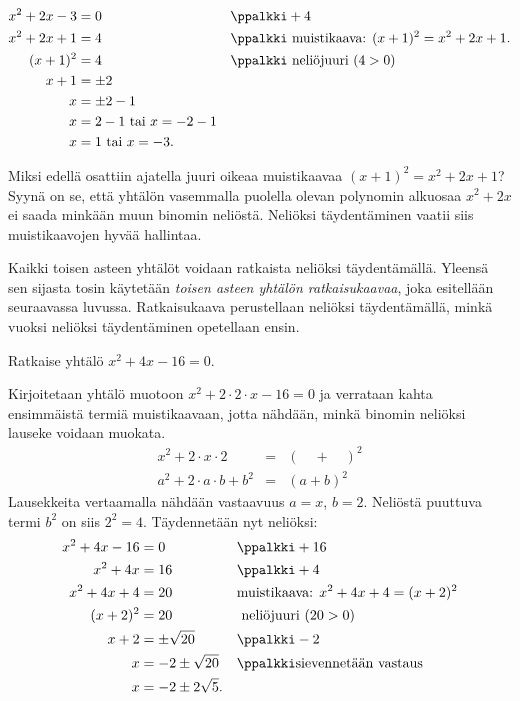 \begin{align*}
x^2+2x-3 & = 0  &&\ppalkki +4 \\
x^2+2x+1 & = 4  &&\ppalkki \text{ muistikaava: } (x+1)^2=x^2+2x+1. \\
(x+1)^2 & = 4  && \ppalkki \text{ neliöjuuri } (4 > 0)\\
x+1 & = \pm 2 \\
x & = \pm 2 - 1 \\
x & = 2-1 \text{ tai } x= -2-1 \\ 
x & = 1 \text{ tai } x= -3. 
\end{align*}

Miksi edellä osattiin ajatella juuri oikeaa muistikaavaa $(x+1)^2=x^2+2x+1$?
Syynä on se, että yhtälön vasemmalla
puolella olevan polynomin alkuosaa $x^2+2x$ ei saada minkään muun
binomin neliöstä. Neliöksi täydentäminen vaatii siis muistikaavojen hyvää
hallintaa.

Kaikki toisen asteen yhtälöt voidaan ratkaista neliöksi täydentämällä. Yleensä sen sijasta tosin käytetään \emph{toisen asteen yhtälön ratkaisukaavaa}, joka esitellään seuraavassa luvussa. Ratkaisukaava perustellaan neliöksi täydentämällä, minkä vuoksi neliöksi täydentäminen opetellaan ensin.

\begin{esimerkki} 
Ratkaise yhtälö $x^2+4x-16 = 0$. 

Kirjoitetaan yhtälö muotoon $x^2+2\cdot 2\cdot x-16 = 0$ ja verrataan kahta ensimmäistä termiä
muistikaavaan, jotta nähdään, minkä binomin neliöksi lauseke voidaan muokata.
\[ \begin{array}{lcl}
x^2+2\cdot x\cdot 2  &=& (\quad + \quad)^2\\
a^2 +2\cdot a\cdot b +b^2 &=& (a+b)^2
\end{array} \]
Lausekkeita vertaamalla nähdään vastaavuus $a = x$, $b = 2$. Neliöstä puuttuva
termi $b^2$ on siis $2^2=4$. Täydennetään nyt neliöksi:
\begin{align*}
x^2+4x-16 &= 0 && \ppalkki +16 \\
x^2+4x &= 16 && \ppalkki +4\\
x^2+4x+4 &= 20 &&  \text{muistikaava: $ x^2+4x+4= (x+2)^2$} \\
(x+2)^2 &= 20  && \text{ neliöjuuri } (20 > 0) \\
x+2 &= \pm \sqrt{20} && \ppalkki -2\\
x &= -2 \pm \sqrt{20} && \ppalkki \text{sievennetään vastaus} \\
x &= -2 \pm 2\sqrt{5}.
\end{align*}
\end{esimerkki}

